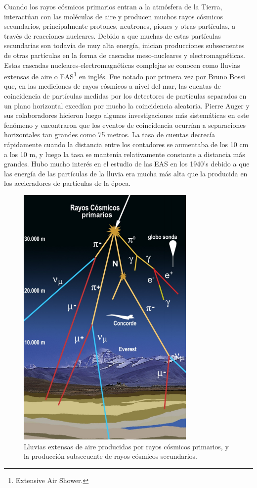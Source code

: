 \documentclass[a4paper,10pt]{article}
\numberwithin{equation}{section}
\begin{document}
Cuando los rayos cósmicos primarios entran a la atmósfera de la Tierra, interactúan 
con las moléculas de aire y producen muchos rayos cósmicos secundarios, principalmente 
protones, neutrones, piones y otras partículas, a través de reacciones nucleares. 
Debido a que muchas de estas partículas secundarias son todavía de muy alta energía, 
inician producciones subsecuentes de otras partículas en la forma de cascadas 
meso-nucleares y electromagnéticas. Estas cascadas nucleares-electromagnéticas complejas 
se conocen como lluvias extensas de aire o EAS\footnote{Extensive Air Shower.} en 
inglés. Fue notado por primera vez por Bruno Bossi que, en las mediciones de 
rayos cósmicos a nivel del mar, las cuentas de coincidencia de partículas 
medidas por los detectores de partículas separados en un plano horizontal 
excedían por mucho la coincidencia aleatoria. Pierre Auger y sus colaboradores 
hicieron luego algunas investigaciones más sistemáticas en este fenómeno y 
encontraron que los eventos de coincidencia ocurrían a separaciones horizontales 
tan grandes como 75 metros. La tasa de cuentas decrecía rápidamente cuando la 
distancia entre los contadores se aumentaba de los 10 cm a los 10 m, y luego 
la tasa se mantenía relativamente constante a distancia más grandes. Hubo mucho 
interés en el estudio de las EAS en los 1940's debido a que las energía de las 
partículas de la lluvia era mucha más alta que la producida en los aceleradores de 
partículas de la época. 

\begin{figure}[H]
 \center 
 \includegraphics[scale=0.7]{fig2}
 \caption{Lluvias extensas de aire producidas por rayos cósmicos primarios, y la 
 producción subsecuente de rayos cósmicos secundarios.}
 \label{fig:fig2}
\end{figure}
\end{document}
